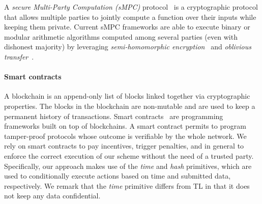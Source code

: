 A {\em secure Multi-Party Computation (\em sMPC)} protocol~\cite{DBLP:journals/corr/abs-1804-03548,yao82} is a cryptographic protocol that allows multiple parties to jointly compute a function over their inputs while keeping them private.
Current sMPC frameworks are able to execute binary or modular arithmetic algorithms computed among several parties (even with dishonest majority) by leveraging {\em semi-homomorphic encryption}~\cite{spdz,keller2018overdrive} and {\em oblivious transfer}~\cite{mascot,rabin2005exchange}.

\smallskip

\paragraph*{Smart contracts}

A blockchain is an append-only list of blocks linked together via cryptographic properties. The blocks in the blockchain are non-mutable and are used to keep a permanent history of transactions.
Smart contracts~\cite{szabo1997formalizing} are programming frameworks built on top of blockchains.
A smart contract permits to program tamper-proof protocols whose outcome is verifiable by the whole network.
%
%
We rely on smart contracts to pay incentives, trigger penalties, and in general to enforce the correct execution of our scheme without the need of a trusted party.
Specifically, our approach makes use of the {\em time} and {\em hash} primitives, which are used to conditionally execute actions based on time and submitted data, respectively.
We remark that the {\em time} primitive differs from TL in that it does not keep any data confidential.

